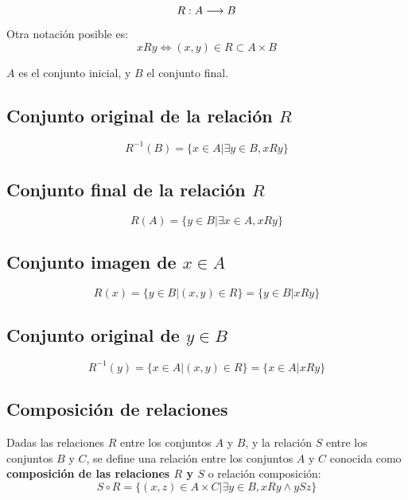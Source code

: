 \[
R: A \longrightarrow B \\
\]

Otra notación posible es:
\[
xRy \Leftrightarrow (x,y) \in R \subset A \times B
\]

$A$ es el conjunto inicial, y $B$ el conjunto final.

\subsection{Conjunto original de la relación $R$}

\[
R^{-1}(B)=\{x \in A | \exists y \in B, xRy\}
\]

\subsection{Conjunto final de la relación $R$}

\[
R(A)=\{y \in B | \exists x \in A, xRy\}
\]

\subsection{Conjunto imagen de $x \in A$}

\[
R(x)=\{y \in B | (x,y) \in R\} = \{y \in B | xRy\}
\]

\subsection{Conjunto original de $y \in B$}

\[
R^{-1}(y)=\{x \in A | (x,y) \in R\} = \{x \in A | xRy\}
\]

\subsection{Composición de relaciones}

Dadas las relaciones $R$ entre los conjuntos $A$ y $B$, y la relación $S$ entre los conjuntos $B$ y $C$, se define una relación entre los conjuntos $A$ y $C$ conocida como \textbf{composición de las relaciones $R$ y $S$} o relación composición:
\[
S \circ R = \{(x,z) \in A \times C | \exists y \in B, xRy \wedge ySz\}
\]

